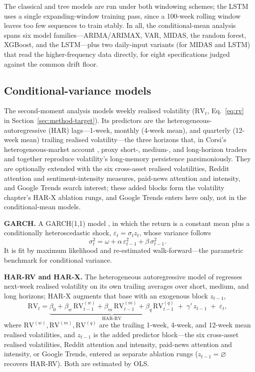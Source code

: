 \documentclass[12pt, a4paper]{article}
\begin{document}
The classical and tree models are run under both windowing schemes; the LSTM uses a single
expanding-window training pass, since a 100-week rolling window leaves too few sequences to
train stably. In all, the conditional-mean analysis spans six model families---ARIMA/ARIMAX,
VAR, MIDAS, the random forest, XGBoost, and the LSTM---plus two daily-input variants (for MIDAS and LSTM) that read the higher-frequency data directly, for eight specifications judged
against the common drift floor.

\subsection{Conditional-variance models}
\label{sec:method-var}

The second-moment analysis models weekly realised volatility (\(\mathrm{RV}_t\),
Eq.~\ref{eq:rv} in Section~\ref{sec:method-target}). Its predictors are the heterogeneous-autoregressive (HAR)
lags---1-week, monthly (4-week mean), and quarterly (12-week mean) trailing realised
volatility---the three horizons that, in Corsi's heterogeneous-market account
\parencite{corsi2009}, proxy short-, medium-, and long-horizon traders and together reproduce
volatility's long-memory persistence parsimoniously. They are
optionally extended with the six cross-asset realised volatilities,
Reddit attention and sentiment-intensity measures, paid-news attention and intensity, and
Google Trends search interest; these added blocks form the volatility chapter's HAR-X
ablation rungs, and Google Trends enters here only, not in the conditional-mean models.

\textbf{GARCH.} A GARCH(1,1) model \parencite{engle1982,bollerslev1986}, in which the
return is a constant mean plus a conditionally heteroscedastic shock,
\(\varepsilon_t = \sigma_t z_t\), whose variance follows
\begin{equation}
    \sigma_t^2 = \omega + \alpha\,\varepsilon_{t-1}^2 + \beta\,\sigma_{t-1}^2 .
\end{equation}
It is fit by maximum likelihood and re-estimated walk-forward---the parametric benchmark
for conditional variance.

\textbf{HAR-RV and HAR-X.} The heterogeneous autoregressive model of \textcite{corsi2009}
regresses next-week realised volatility on its own trailing averages over short, medium,
and long horizons; HAR-X augments that base with an exogenous block \(z_{t-1}\),
\begin{equation}
    \mathrm{RV}_t =
    \underbrace{\beta_0
    + \beta_w\,\mathrm{RV}^{(w)}_{t-1}
    + \beta_m\,\mathrm{RV}^{(m)}_{t-1}
    + \beta_q\,\mathrm{RV}^{(q)}_{t-1}}_{\text{HAR-RV}}
    \; + \; \gamma'\, z_{t-1} \; + \; \varepsilon_t ,
\end{equation}
where \(\mathrm{RV}^{(w)}, \mathrm{RV}^{(m)}, \mathrm{RV}^{(q)}\) are the trailing 1-week,
4-week, and 12-week mean realised volatilities, and \(z_{t-1}\) is the added predictor
block---the six cross-asset realised volatilities, Reddit attention and intensity,
paid-news attention and intensity, or Google Trends, entered as separate ablation rungs
(\(z_{t-1}=\varnothing\) recovers HAR-RV). Both are estimated by OLS.
\end{document}
